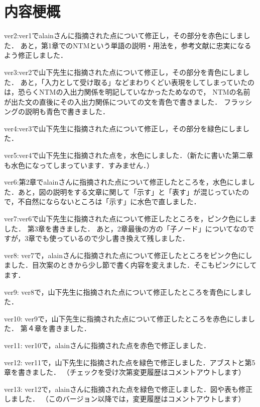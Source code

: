 \chapter*{内容梗概}
ver2:ver1でalainさんに指摘された点について修正し，その部分を赤色にしました．
あと，第1章でのNTMという単語の説明・用法を，参考文献に忠実になるよう修正しました．

ver3:ver2で山下先生に指摘された点について修正し，その部分を青色にしました．
あと，「入力として受け取る」などまわりくどい表現をしてしまっていたのは，恐らくNTMの入出力関係を明記していなかったためなので，
NTMの名前が出た文の直後にその入出力関係についての文を青色で書きました．
フラッシングの説明も青色で書きました．

ver4:ver3で山下先生に指摘された点について修正し，その部分を緑色にしました．

ver5:ver4で山下先生に指摘された点を，水色にしました．（新たに書いた第二章も水色になってしまっています．すみません．）

ver6:第2章でalainさんに指摘された点について修正したところを，水色にしました．あと，図の説明をする文章に関して「示す」と「表す」が混じっていたので，不自然にならないところは「示す」に水色で直しました．

ver7:ver6で山下先生に指摘された点について修正したところを，ピンク色にしました．
第3章を書きました．
あと，2章最後の方の「子ノード」についてなのですが，3章でも使っているので少し書き換えて残しました．

ver8:
ver7で，alainさんに指摘された点について修正したところをピンク色にしました．目次案のときから少し節で書く内容を変えました．そこもピンクにしてます．

ver9:
ver8で，山下先生に指摘された点について修正したところを青色にしました．

ver10: 
ver9で，山下先生に指摘された点について修正したところを赤色にしました．
第４章を書きました．

ver11: 
ver10で，alainさんに指摘された点を赤色で修正しました．

ver12: 
ver11で，山下先生に指摘された点を緑色で修正しました．アブストと第5章を書きました．
（チェックを受け次第変更履歴はコメントアウトします）

ver13: 
ver12で，alainさんに指摘された点を緑色で修正しました．図や表も修正しました．
（このバージョン以降では，変更履歴はコメントアウトします）
\newpage 

